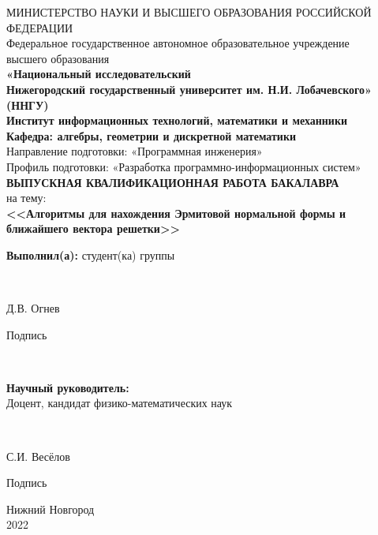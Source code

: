 \begin{titlepage}
\newpage

\begin{center}
	МИНИСТЕРСТВО НАУКИ И ВЫСШЕГО ОБРАЗОВАНИЯ РОССИЙСКОЙ ФЕДЕРАЦИИ \\
	\fontsize{14}{12}\selectfont
	Федеральное государственное автономное образовательное учреждение\\ высшего образования \\
	
	\textbf
	{«Национальный исследовательский \\ Нижегородский государственный
	 университет им. Н.И. Лобачевского» \\ (ННГУ)} \\
	\hfill \break
	\hfill \break
	\hfill \break
	\textbf{Институт информационных технологий, математики и механники} \\
	\hfill \break
	\hfill \break
	\textbf{Кафедра: алгебры, геометрии и дискретной математики} \\
	\hfill \break
	\hfill \break
	Направление подготовки: «Программная инженерия» \\
	\fontsize{13}{12}\selectfont
	Профиль подготовки: «Разработка программно-информационных систем» \\
	\fontsize{14}{12}\selectfont
	\hfill \break
	\hfill \break
	\hfill \break
	\textbf{ВЫПУСКНАЯ КВАЛИФИКАЦИОННАЯ РАБОТА БАКАЛАВРА} \\
	\vspace{1em}
	на тему: \\
	\textbf{<<Алгоритмы для нахождения Эрмитовой нормальной формы и ближайшего вектора решетки>>} \\
\end{center}

\vspace{7em}

\fontsize{14}{12}\selectfont
\hfill\parbox{8cm}{
	\textbf{Выполнил(а):} студент(ка) группы \makebox[1cm]{\hrulefill}
} \\
\vspace{1em}
\hfill\parbox{7cm}{
	\underline{\hspace{4cm}} Д.В. Огнев
	\begin{center}
	Подпись
	\end{center}
}\\
\vspace{1em}
\hfill\parbox{8cm}{
	\textbf{Научный руководитель:} \\
	Доцент, кандидат физико-математических наук
} \\
\vspace{1em}
\hfill\parbox{7cm}{
	\underline{\hspace{4cm}} С.И. Весёлов
	\begin{center}
	Подпись
	\end{center}
}


\vspace{\fill}

\begin{center}
Нижний Новгород \\2022
\end{center}

\end{titlepage}
\clearpage